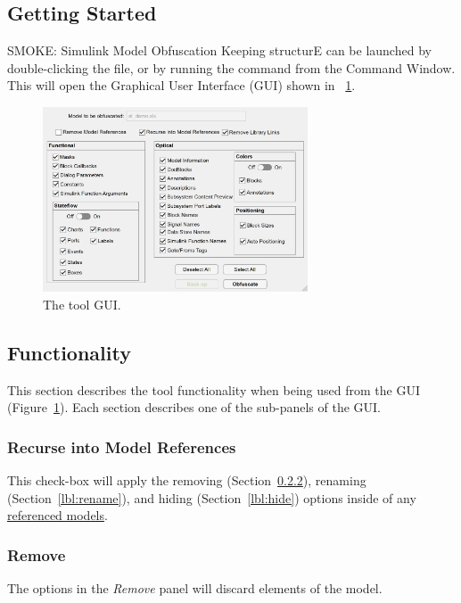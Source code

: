 \documentclass{article}
\makeatletter
\newcommand{\ToolName}{SMOKE: Simulink Model Obfuscation Keeping structurE\@\xspace}
\makeatother
\begin{document}
\subsection{Getting Started}
\ToolName can be launched by double-clicking the  file, or by running the command  from the Command Window. This will open the Graphical User Interface (GUI) shown in \figurename~\ref{fig:contextMenu}.

\begin{figure}[htb!]
	\centering
	\includegraphics[width=0.7\textwidth]{../figs/GUI}
	\caption{The tool GUI.}
	\label{fig:contextMenu}
\end{figure}

\newpage
\subsection{Functionality}
This section describes the tool functionality when being used from the GUI (Figure~\ref{fig:contextMenu}). Each section describes one of the sub-panels of the GUI.

\subsubsection{Recurse into Model References}
This check-box will apply the removing (Section~\ref{lbl:remove}), renaming (Section~\ref{lbl:rename}), and hiding (Section~\ref{lbl:hide}) options inside of any \href{https://de.mathworks.com/help/simulink/model-reference.html}{referenced models}.

\subsubsection{Remove}
\label{lbl:remove}
The options in the \emph{Remove} panel will discard elements of the model.
\end{document}
